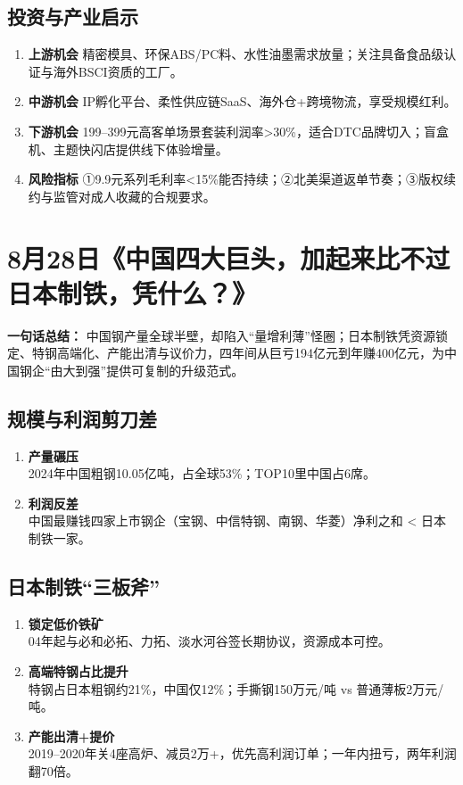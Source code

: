 \subsection{投资与产业启示}
\begin{enumerate}[leftmargin=*, nosep]
    \item \textbf{上游机会}  
    精密模具、环保ABS/PC料、水性油墨需求放量；关注具备食品级认证与海外BSCI资质的工厂。
    \item \textbf{中游机会}  
    IP孵化平台、柔性供应链SaaS、海外仓+跨境物流，享受规模红利。
    \item \textbf{下游机会}  
    199–399元高客单场景套装利润率>30\%，适合DTC品牌切入；盲盒机、主题快闪店提供线下体验增量。
    \item \textbf{风险指标}  
    ①9.9元系列毛利率<15\%能否持续；②北美渠道返单节奏；③版权续约与监管对成人收藏的合规要求。
\end{enumerate}

\section{8月28日《中国四大巨头，加起来比不过日本制铁，凭什么？》}
\textbf{一句话总结：}  
中国钢产量全球半壁，却陷入“量增利薄”怪圈；日本制铁凭资源锁定、特钢高端化、产能出清与议价力，四年间从巨亏194亿元到年赚400亿元，为中国钢企“由大到强”提供可复制的升级范式。

\subsection{规模与利润剪刀差}
\begin{enumerate}[leftmargin=*, nosep]
    \item \textbf{产量碾压}  \\
    2024年中国粗钢10.05亿吨，占全球53\%；TOP10里中国占6席。
    \item \textbf{利润反差}  \\
    中国最赚钱四家上市钢企（宝钢、中信特钢、南钢、华菱）净利之和 < 日本制铁一家。
\end{enumerate}

\subsection{日本制铁“三板斧”}
\begin{enumerate}[leftmargin=*, nosep]
    \item \textbf{锁定低价铁矿}  \\
    04年起与必和必拓、力拓、淡水河谷签长期协议，资源成本可控。
    \item \textbf{高端特钢占比提升}  \\
    特钢占日本粗钢约21\%，中国仅12\%；手撕钢150万元/吨 vs 普通薄板2万元/吨。
    \item \textbf{产能出清+提价}  \\
    2019–2020年关4座高炉、减员2万+，优先高利润订单；一年内扭亏，两年利润翻70倍。
\end{enumerate}

